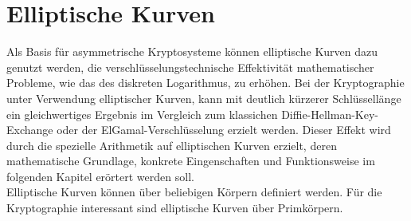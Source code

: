 \chapter{Elliptische Kurven} \label{sec:elliptische_kurve}


Als Basis für asymmetrische Kryptosysteme können elliptische Kurven dazu genutzt werden, die verschlüsselungstechnische Effektivität mathematischer Probleme, wie das des diskreten Logarithmus, zu erhöhen. Bei der Kryptographie unter Verwendung elliptischer Kurven, kann mit deutlich kürzerer Schlüssellänge ein gleichwertiges Ergebnis im Vergleich zum klassichen Diffie-Hellman-Key-Exchange oder der ElGamal-Verschlüsselung erzielt werden. Dieser Effekt wird durch die spezielle Arithmetik auf elliptischen Kurven erzielt, deren mathematische Grundlage, konkrete Eingenschaften und Funktionsweise im folgenden Kapitel erörtert werden soll.\\

Elliptische Kurven können über beliebigen Körpern definiert werden. Für die Kryptographie interessant sind elliptische Kurven über Primkörpern.\\






